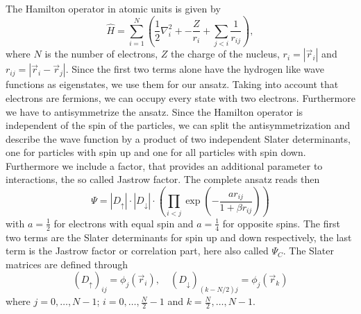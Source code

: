 \documentclass[a4paper,10pt]{article}
\begin{document}
The Hamilton operator in atomic units is given by
\begin{equation}
 \hat H = \sum_{i=1}^{N} \left( \frac12 \nabla_i^2 +  -\frac{Z}{r_i} + \sum_{j<i} \frac{1}{r_{ij}} \right),
\end{equation}
where $N$ is the number of electrons, $Z$ the charge of the nucleus, $r_i = |\vec{r}_i|$ and $r_{ij} = |\vec{r}_i -\vec{r}_j|$. 
Since the first two terms alone have the hydrogen like wave functions as eigenstates, we use them for our ansatz. Taking into account that electrons are fermions, we 
can occupy every state with two electrons. Furthermore we have to antisymmetrize the ansatz. Since the Hamilton operator is independent of the spin of the particles,
we can split the antisymmetrization and describe the wave function by a product of two independent Slater determinants, 
one for particles with spin up and one for all particles with spin down. 
Furthermore we include a factor, that provides an additional parameter to  interactions, the so called Jastrow factor. 
The complete ansatz reads then
\begin{equation}
 \Psi = |D_{\uparrow}|\cdot|D_{\downarrow}|\cdot\left(\prod_{i<j} \exp \left(-\frac{ar_{ij}}{1+\beta r_{ij}}\right) \right)
\end{equation}
with $a=\frac12$ for electrons with equal spin and $a=\frac14$ for opposite spins.
The first two terms are the Slater determinants for spin up and down respectively, the last term is the Jastrow factor or correlation part, here also called $\Psi_C$.
The Slater matrices are defined through
\begin{equation} 
 (D_{\uparrow})_{ij} = \phi_j(\vec{r}_i), \quad (D_{\downarrow})_{\left(k-N/2\right)j} = \phi_j(\vec{r}_k)
\end{equation}
where $j=0,\dots,N-1$; $i=0,\dots ,\frac{N}{2}-1$ and $k=\frac{N}{2},\dots, N-1$.
\end{document}
